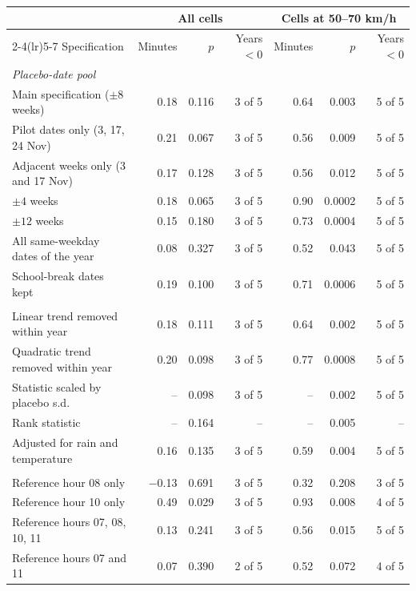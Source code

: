 \begin{tabular}{lrrrrrr}
\toprule
 & \multicolumn{3}{c}{All cells} & \multicolumn{3}{c}{Cells at 50--70 km/h} \\
\cmidrule(lr){2-4}\cmidrule(lr){5-7}
Specification & Minutes & $p$ & Years $<0$ & Minutes & $p$ & Years $<0$ \\
\midrule
\multicolumn{7}{l}{\textit{Placebo-date pool}} \\
\quad Main specification ($\pm 8$ weeks) & 0.18 & 0.116 & 3 of 5 & 0.64 & 0.003 & 5 of 5 \\
\quad Pilot dates only (3, 17, 24 Nov) & 0.21 & 0.067 & 3 of 5 & 0.56 & 0.009 & 5 of 5 \\
\quad Adjacent weeks only (3 and 17 Nov) & 0.17 & 0.128 & 3 of 5 & 0.56 & 0.012 & 5 of 5 \\
\quad $\pm 4$ weeks & 0.18 & 0.065 & 3 of 5 & 0.90 & 0.0002 & 5 of 5 \\
\quad $\pm 12$ weeks & 0.15 & 0.180 & 3 of 5 & 0.73 & 0.0004 & 5 of 5 \\
\quad All same-weekday dates of the year & 0.08 & 0.327 & 3 of 5 & 0.52 & 0.043 & 5 of 5 \\
\quad School-break dates kept & 0.19 & 0.100 & 3 of 5 & 0.71 & 0.0006 & 5 of 5 \\
\addlinespace
\multicolumn{7}{l}{\textit{Trend and scaling}} \\
\quad Linear trend removed within year & 0.18 & 0.111 & 3 of 5 & 0.64 & 0.002 & 5 of 5 \\
\quad Quadratic trend removed within year & 0.20 & 0.098 & 3 of 5 & 0.77 & 0.0008 & 5 of 5 \\
\quad Statistic scaled by placebo s.d. & -- & 0.098 & 3 of 5 & -- & 0.002 & 5 of 5 \\
\quad Rank statistic & -- & 0.164 & -- & -- & 0.005 & -- \\
\quad Adjusted for rain and temperature & 0.16 & 0.135 & 3 of 5 & 0.59 & 0.004 & 5 of 5 \\
\addlinespace
\multicolumn{7}{l}{\textit{Reference hours}} \\
\quad Reference hour 08 only & \ensuremath{-}0.13 & 0.691 & 3 of 5 & 0.32 & 0.208 & 3 of 5 \\
\quad Reference hour 10 only & 0.49 & 0.029 & 3 of 5 & 0.93 & 0.008 & 4 of 5 \\
\quad Reference hours 07, 08, 10, 11 & 0.13 & 0.241 & 3 of 5 & 0.56 & 0.015 & 5 of 5 \\
\quad Reference hours 07 and 11 & 0.07 & 0.390 & 2 of 5 & 0.52 & 0.072 & 4 of 5 \\

\end{tabular}
